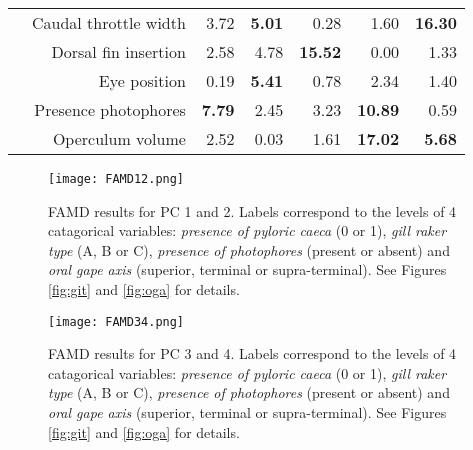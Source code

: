 \begin{table}[!htbp]
\begin{adjustbox}{max width=1.1\textwidth,center}
\begin{tabular}{>{\bfseries}crrrrrr}
  &Caudal throttle width & 3.72 & \textbf{5.01} & 0.28 & 1.60 & \textbf{16.30} \\ 
  &Dorsal fin insertion & 2.58 & 4.78 & \textbf{15.52} & 0.00 & 1.33 \\ 
  \midrule
  \multirow{2}{*}{Habitat} &Eye position & 0.19 & \textbf{5.41} & 0.78 & 2.34 & 1.40 \\ 
  &Presence photophores & \textbf{7.79} & 2.45 & 3.23 & \textbf{10.89} & 0.59 \\
  &Operculum volume & 2.52 & 0.03 & 1.61 & \textbf{17.02} & \textbf{5.68} \\ 
   \bottomrule
\end{tabular}
\end{adjustbox}
\end{table}

\begin{figure} [!htbp]
	\begin{center}
		\texttt{[image: FAMD12.png]}  
	\end{center}
	\caption[FAMD results for first and second axis]{FAMD results for PC 1 and 2. Labels correspond to the levels of 4 catagorical variables: \emph{presence of pyloric caeca} (0 or 1), \emph{gill raker type} (A, B or C), \emph{presence of photophores} (present or absent) and \emph{oral gape axis} (superior, terminal or supra-terminal). See Figures \ref{fig:git} and \ref{fig:oga} for details.}
	\label{fig:famd12}
\end{figure}

\begin{figure} [!htbp]
	\begin{center}
		\texttt{[image: FAMD34.png]}
	\end{center}
	\caption[FAMD results for third and fourth axis]{FAMD results for PC 3 and 4. Labels correspond to the levels of 4 catagorical variables: \emph{presence of pyloric caeca} (0 or 1), \emph{gill raker type} (A, B or C), \emph{presence of photophores} (present or absent) and \emph{oral gape axis} (superior, terminal or supra-terminal). See Figures \ref{fig:git} and \ref{fig:oga} for details.}
	\label{fig:famd34}
\end{figure}
\restoregeometry


